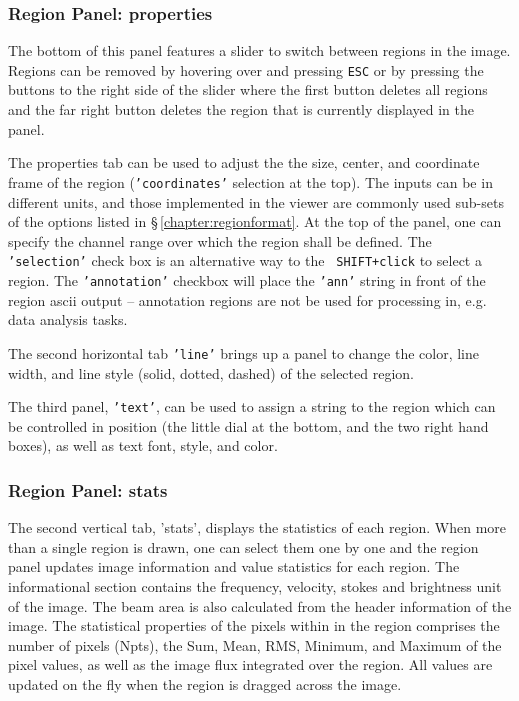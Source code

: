 \subsubsection{Region Panel: properties}
\label{section:display.image.rgnmgr.props}

The bottom of this panel features a slider to switch between regions
in the image. Regions can be removed by hovering over and pressing
{\tt ESC} or by pressing the buttons to the right side of the slider
where the first button deletes all regions and the far right button
deletes the region that is currently displayed in the panel.

The properties tab can be used to adjust the the size, center, and
coordinate frame of the region ({\tt 'coordinates'} selection at the
top). The inputs can be in different units, and those implemented in
the viewer are commonly used sub-sets of the options listed
in \S\,\ref{chapter:regionformat}. At the top of the panel, one can
specify the channel range over which the region shall be defined. The {\tt
  'selection'} check box is an alternative way to the {\tt
  SHIFT+click} to select a region. The {\tt 'annotation'} checkbox
will place the {\tt 'ann'} string in front of the region ascii output
-- annotation regions are not be used for processing in, e.g. data
analysis tasks.


The second horizontal tab {\tt 'line'} brings up a panel to change the
color, line width, and line style (solid, dotted, dashed) of the
selected region. 

The third panel, {\tt 'text'}, can be used to assign a string to the
region which can be controlled in position (the little dial at the
bottom, and the two right hand boxes), as well as text font, style,
and color. 


\subsubsection{Region Panel: stats}
\label{section:display.image.rgnmgr.stats}

The second vertical tab, 'stats', displays the statistics of each
region. When more than a single region is drawn, one can select them
one by one and the region panel updates image information and value
statistics for each region. The informational section contains the
frequency, velocity, stokes and brightness unit of the image. The beam
area is also calculated from the header information of the image. The
statistical properties of the pixels within in the region comprises
the number of pixels (Npts), the Sum, Mean, RMS, Minimum, and Maximum
of the pixel values, as well as the image flux integrated over the
region. All values are updated on the fly when the region is dragged
across the image.

